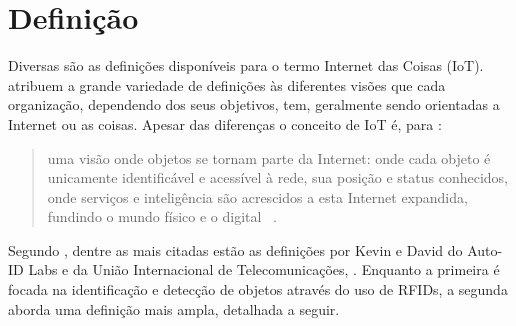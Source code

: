 \documentclass[twoside,english,brazilian]{UNISINOSmonografia}
\begin{document}
\section{Definição}

	Diversas são as definições disponíveis para o termo Internet das 
	Coisas (IoT).  atribuem a grande variedade de 
	definições às diferentes visões que cada organização, dependendo dos 
	seus objetivos, tem, geralmente sendo orientadas a Internet ou as 
	coisas. Apesar das diferenças o conceito de IoT é, para 
	:
	
	\begin{quote}
		uma visão onde objetos se tornam parte da Internet: onde cada 
		objeto é unicamente identificável e acessível à rede, sua posição 
		e status conhecidos, onde serviços e inteligência são acrescidos a 
		esta Internet expandida, fundindo o mundo físico e o digital~
		\cite{Coetzee2011}.
	\end{quote}
	
	Segundo , dentre as mais citadas estão as 
	definições por Kevin  e David 
	 do Auto-ID Labs e da União Internacional de 
	Telecomunicações, . Enquanto a primeira é focada na 
	identificação e detecção de objetos através do uso de RFIDs, a segunda 
	aborda uma definição mais ampla, detalhada a seguir.
	
\end{document}
